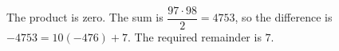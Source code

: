 The product is zero. The sum is $\dfrac{97\cdot98}{2}=4753$, so the difference is $-4753=10(-476)+7$. The required remainder is $\boxed7$.

